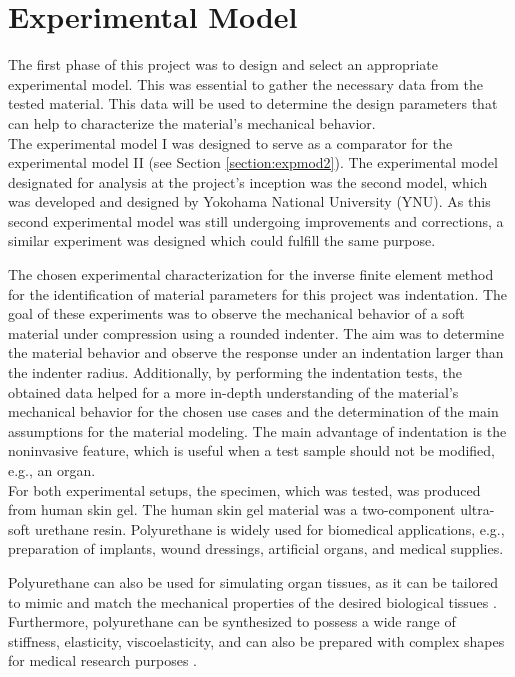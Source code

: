 \chapter{Experimental Model} %
\label{chapter:experimentalmodel}

The first phase of this project was to design and select an appropriate 
experimental model. This was essential to gather the necessary data from the 
tested material. This data will be used to determine the design parameters 
that can help to characterize the material's mechanical behavior. \\

The experimental model I was designed to serve as a comparator for the experimental 
model II (see Section \ref{section:expmod2}). 
The experimental model designated for analysis at the project's inception was the second model, which was developed and designed by Yokohama National 
University (YNU). As this second experimental model was still undergoing improvements and corrections, a similar 
experiment was designed which could fulfill the same purpose.

The chosen experimental characterization for the inverse finite element method for 
 the identification of material parameters for this project was indentation.
The goal of these experiments was to observe the mechanical behavior of a soft material under 
compression using a rounded indenter. The aim was to determine the material behavior and 
observe the response under an indentation larger than the indenter radius. Additionally, 
by performing the indentation tests, the obtained 
data helped for a more in-depth understanding of the material's mechanical behavior for the chosen 
use cases and the determination of the main assumptions for the material modeling.
The main advantage of indentation is the noninvasive feature, which is 
useful when a test sample should not be modified, e.g., an organ.\\

For both experimental setups, the specimen, which was tested, was produced from human skin gel.
The human skin gel material was a two-component ultra-soft urethane resin.
Polyurethane is widely used for biomedical applications, e.g., preparation of implants, wound dressings, artificial 
organs, and medical supplies. 

Polyurethane can also be used for simulating organ tissues, as it can be tailored to mimic 
and match the mechanical properties of the desired biological tissues \cite{Wang2012}.  Furthermore, polyurethane can be 
synthesized to possess a wide range of stiffness, elasticity, viscoelasticity, and can also be prepared 
with complex shapes for medical research purposes \cite{Joseph2018}. \\

